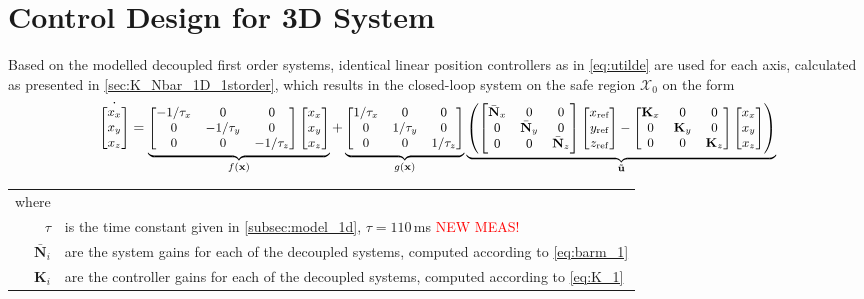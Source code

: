 \section{Control Design for 3D System}
Based on the modelled decoupled first order systems, identical linear position controllers as in \autoref{eq:utilde} are used for each axis, calculated as presented in \autoref{sec:K_Nbar_1D_1storder}, which results in the closed-loop system on the safe region $\mathcal{X}_0$ on the form
\begin{equation}\label{eq:3D_sys_static}
\small
\dot{\begin{bmatrix}
	x_x\\x_y\\x_z
	\end{bmatrix}} =
\underbrace{\begin{bmatrix}
	-1/\tau_x & 0 & 0\\0 & -1/\tau_y & 0 \\ 0 & 0 & -1/\tau_z
	\end{bmatrix}
	\begin{bmatrix}
	x_x\\x_y\\x_z
	\end{bmatrix}}_{f(\mathbf{x})} +
\underbrace{\begin{bmatrix}
	1/\tau_x& 0 & 0 \\ 0& 1/\tau_y & 0 \\0& 0& 1/\tau_z
	\end{bmatrix}}_{g(\mathbf{x})}
\underbrace{\left(\begin{bmatrix}
	\bar{\mathbf{N}}_x & 0 & 0 \\0 & \bar{\mathbf{N}}_y & 0 \\0& 0& \bar{\mathbf{N}}_z
	\end{bmatrix}
	\begin{bmatrix}
	x_\text{ref}\\y_\text{ref}\\z_\text{ref}
	\end{bmatrix}
	-
	\begin{bmatrix}
	\mathbf{K}_x & 0 & 0 \\0 & \mathbf{K}_y & 0 \\0& 0&  \mathbf{K}_z
	\end{bmatrix}
	\begin{bmatrix}
	x_x\\x_y\\x_z
	\end{bmatrix}\right)}_{\tilde{\mathbf{u}}}
\end{equation}
\begin{tabular}{rl}
where & \\
$\tau$ & is the time constant given in \autoref{subsec:model_1d}, $\tau = 110$\,ms \textcolor{red}{NEW MEAS!}\\
$\bar{\mathbf{N}}_i$ & are the system gains for each of the decoupled systems, computed according to \autoref{eq:barm_1}\\
$\mathbf{K}_i$ & are the controller gains for each of the decoupled systems, computed according to \autoref{eq:K_1}\\
\end{tabular}\\

